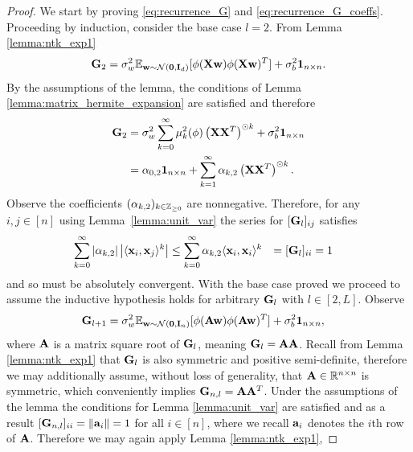 \begin{proof}
    We start by proving \eqref{eq:recurrence_G} and \eqref{eq:recurrence_G_coeffs}. Proceeding by induction, consider the base case $l=2$. From Lemma \ref{lemma:ntk_exp1}
    \[
        \mathbf{G}_{2} = \sigma_w^2 \mathbb{E}_{\mathbf w \sim \mathcal{N}(\textbf{0}, \textbf{I}_d)}[\phi(\mathbf{X} \mathbf w) \phi(\mathbf{X} \mathbf w)^T] + \sigma_b^2 \textbf{1}_{n \times n}.
    \]
    By the assumptions of the lemma, the conditions of Lemma \ref{lemma:matrix_hermite_expansion} are satisfied and therefore
    \[
    \begin{aligned}
        \mathbf{G}_{2} &= \sigma_w^2 \sum_{k = 0}^{\infty} \mu_k^2(\phi) \left(\mathbf{X} \mathbf{X}^T \right)^{\odot k} + \sigma_b^2 \textbf{1}_{n\times n}\\
        & = \alpha_{0,2}\textbf{1}_{n \times n} + \sum_{k=1}^{\infty}\alpha_{k,2}\left(\mathbf{X} \mathbf{X}^T \right)^{\odot k}.
    \end{aligned}
    \]
    Observe the coefficients $(\alpha_{k,2})_{k \in \mathbb{Z}_{\geq 0}}$ are nonnegative. Therefore, for any $i,j \in [n]$ using Lemma~\ref{lemma:unit_var} the series for $[\mathbf{G}_{l}]_{ij}$ satisfies 
    \begin{equation}\label{eq:absolute_convergence_G_entries}
    \begin{aligned}
        \sum_{k=0}^{\infty} \left\lvert\alpha_{k,2}\right\rvert \left\lvert\langle \mathbf x_i, \mathbf x_j \rangle^{k}\right\rvert 
        & \leq \sum_{k=0}^{\infty} \alpha_{k,2} \langle \mathbf x_i, \mathbf x_i \rangle^{k}
        & = [\mathbf{G}_{l}]_{ii}
        & = 1
    \end{aligned}
    \end{equation}
    and so must be absolutely convergent. With the base case proved we proceed to assume the inductive hypothesis holds for arbitrary $\mathbf{G}_{l}$ with $l \in [2,L]$. Observe
    \[
    \begin{aligned}
        \mathbf{G}_{l+1}  &= \sigma_w^2 \mathbb{E}_{\mathbf w \sim \mathcal{N}(\textbf{0}, \textbf{I}_n)}[\phi(\mathbf{A} \mathbf w) \phi(\mathbf{A} \mathbf w)^T] + \sigma_b^2 \textbf{1}_{n \times n},
    \end{aligned}
    \]
    where $\mathbf{A}$ is a matrix square root of $\mathbf{G}_{l}$, meaning $\mathbf{G}_{l} = \mathbf{A} \mathbf{A}$. Recall from Lemma \ref{lemma:ntk_exp1} that $\mathbf{G}_{l}$ is also symmetric and positive semi-definite, therefore we may additionally assume, without loss of generality, that $\mathbf{A} \in \mathbb{R}^{n \times n}$ is symmetric, which conveniently implies $\mathbf{G}_{n,l} = \mathbf{A} \mathbf{A}^T$. Under the assumptions of the lemma the conditions for Lemma \ref{lemma:unit_var} are satisfied and as a result $[\mathbf{G}_{n,l}]_{ii} = \left\lVert\mathbf a_i\right\rVert = 1$ for all $i \in [n]$, where we recall $\mathbf a_i$ denotes the $i$th row of $\mathbf{A}$. Therefore we may again apply Lemma \ref{lemma:ntk_exp1},

\end{proof}
